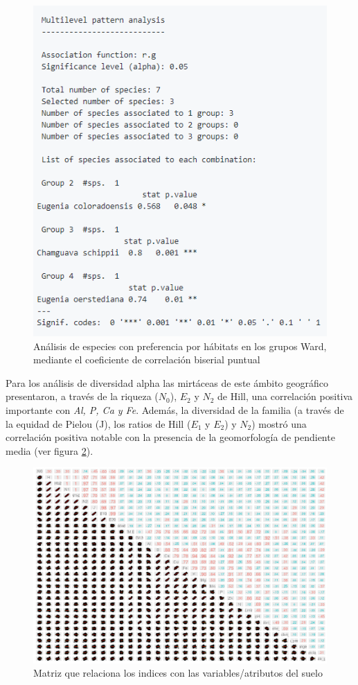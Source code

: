 \documentclass[11pt,]{article}
\begin{document}
\begin{figure}
\centering
\includegraphics{rg_analisis.png}
\caption{Análisis de especies con preferencia por hábitats en los grupos
Ward, mediante el coeficiente de correlación biserial puntual
\label{fig:rg_analisis}}
\end{figure}

Para los análisis de diversidad alpha las mirtáceas de este ámbito
geográfico presentaron, a través de la riqueza (\(N_0\)), \(E_2\) y
\(N_2\) de Hill, una correlación positiva importante con \emph{Al, P, Ca
y Fe}. Además, la diversidad de la familia (a través de la equidad de
Pielou (J), los ratios de Hill (\(E_1\) y \(E_2\)) y \(N_2\)) mostró una
correlación positiva notable con la presencia de la geomorfología de
pendiente media (ver figura \ref{fig:pearson_div}).

\begin{figure}
\centering
\includegraphics{pearson_indcdiversidad.png}
\caption{Matriz que relaciona los indices con las variables/atributos
del suelo \label{fig:pearson_div}}
\end{figure}
\end{document}
